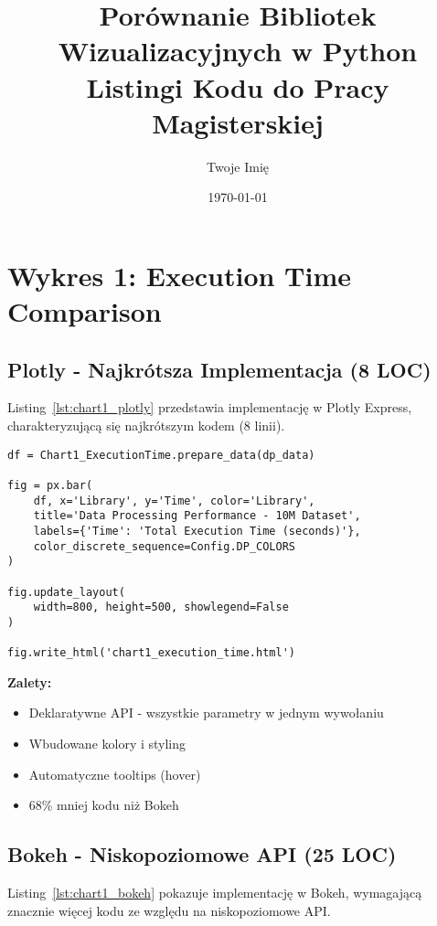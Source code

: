 \documentclass[a4paper,11pt]{article}
\title{Porównanie Bibliotek Wizualizacyjnych w Python\\
\large Listingi Kodu do Pracy Magisterskiej}
\author{Twoje Imię}
\date{\today}
\begin{document}
\maketitle
\tableofcontents
\newpage

\section{Wykres 1: Execution Time Comparison}

\subsection{Plotly - Najkrótsza Implementacja (8 LOC)}

Listing~\ref{lst:chart1_plotly} przedstawia implementację w Plotly Express,
charakteryzującą się najkrótszym kodem (8 linii).

\begin{lstlisting}[caption={Chart 1: Execution Time - Plotly Implementation},label={lst:chart1_plotly}]
df = Chart1_ExecutionTime.prepare_data(dp_data)

fig = px.bar(
    df, x='Library', y='Time', color='Library',
    title='Data Processing Performance - 10M Dataset',
    labels={'Time': 'Total Execution Time (seconds)'},
    color_discrete_sequence=Config.DP_COLORS
)

fig.update_layout(
    width=800, height=500, showlegend=False
)

fig.write_html('chart1_execution_time.html')
\end{lstlisting}

\textbf{Zalety:}
\begin{itemize}
    \item Deklaratywne API - wszystkie parametry w jednym wywołaniu
    \item Wbudowane kolory i styling
    \item Automatyczne tooltips (hover)
    \item 68\% mniej kodu niż Bokeh
\end{itemize}

\subsection{Bokeh - Niskopoziomowe API (25 LOC)}

Listing~\ref{lst:chart1_bokeh} pokazuje implementację w Bokeh,
wymagającą znacznie więcej kodu ze względu na niskopoziomowe API.
\end{document}
